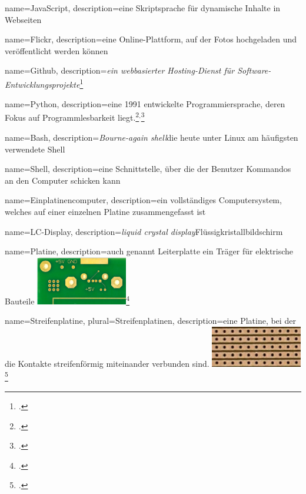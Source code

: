 
{
  name=JavaScript,
  description={eine Skriptsprache für dynamische Inhalte in Webseiten}
}

{
  name=Flickr,
  description={eine Online-Plattform, auf der Fotos hochgeladen und veröffentlicht werden können}
}

{
  name=Github,
  description={\emph{ein webbasierter Hosting-Dienst für Software-Entwicklungsprojekte}\footcite{wiki:github}}
}

{
  name=Python,
  description={eine 1991 entwickelte Programmiersprache, deren Fokus auf Programmlesbarkeit liegt.\footcite{python}$^,$\footcite{python_manual}{}}
}

{
  name=Bash,
  description={\textit{Bourne-again shell}\newline die heute unter Linux am häufigsten verwendete \gls{Shell}}
}

{
  name=Shell,
  description={eine Schnittstelle, über die der Benutzer Kommandos an den Computer schicken kann}
}

{
  name=Einplatinencomputer,
  description={ein vollständiges Computersystem, welches auf einer einzelnen \gls{Platine} zusammengefasst ist}
}

{
  name=LC-Display,
  description={\emph{liquid crystal display}\newline Flüssigkristallbildschirm}
}

{
  name=Platine,
  description={auch genannt Leiterplatte\newline
  ein Träger für elektrische Bauteile\newline
  \includegraphics[width=4cm]{figures/platine.png}\footcite{platine}
    	}
}

{
  name=Streifenplatine,
  plural=Streifenplatinen,
  description={eine \gls{Platine}, bei der die Kontakte streifenförmig miteinander verbunden sind.\newline
  \includegraphics[width=4cm]{figures/streifenplatine.png}\footcite{streifenplatine}
  	}
}

